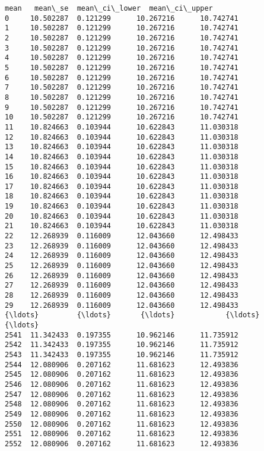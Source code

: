 \documentclass[11pt]{article}
\begin{document}
    \begin{Verbatim}[commandchars=\\\{\}]
           mean   mean\_se  mean\_ci\_lower  mean\_ci\_upper
0     10.502287  0.121299      10.267216      10.742741
1     10.502287  0.121299      10.267216      10.742741
2     10.502287  0.121299      10.267216      10.742741
3     10.502287  0.121299      10.267216      10.742741
4     10.502287  0.121299      10.267216      10.742741
5     10.502287  0.121299      10.267216      10.742741
6     10.502287  0.121299      10.267216      10.742741
7     10.502287  0.121299      10.267216      10.742741
8     10.502287  0.121299      10.267216      10.742741
9     10.502287  0.121299      10.267216      10.742741
10    10.502287  0.121299      10.267216      10.742741
11    10.824663  0.103944      10.622843      11.030318
12    10.824663  0.103944      10.622843      11.030318
13    10.824663  0.103944      10.622843      11.030318
14    10.824663  0.103944      10.622843      11.030318
15    10.824663  0.103944      10.622843      11.030318
16    10.824663  0.103944      10.622843      11.030318
17    10.824663  0.103944      10.622843      11.030318
18    10.824663  0.103944      10.622843      11.030318
19    10.824663  0.103944      10.622843      11.030318
20    10.824663  0.103944      10.622843      11.030318
21    10.824663  0.103944      10.622843      11.030318
22    12.268939  0.116009      12.043660      12.498433
23    12.268939  0.116009      12.043660      12.498433
24    12.268939  0.116009      12.043660      12.498433
25    12.268939  0.116009      12.043660      12.498433
26    12.268939  0.116009      12.043660      12.498433
27    12.268939  0.116009      12.043660      12.498433
28    12.268939  0.116009      12.043660      12.498433
29    12.268939  0.116009      12.043660      12.498433
{\ldots}         {\ldots}       {\ldots}            {\ldots}            {\ldots}
2541  11.342433  0.197355      10.962146      11.735912
2542  11.342433  0.197355      10.962146      11.735912
2543  11.342433  0.197355      10.962146      11.735912
2544  12.080906  0.207162      11.681623      12.493836
2545  12.080906  0.207162      11.681623      12.493836
2546  12.080906  0.207162      11.681623      12.493836
2547  12.080906  0.207162      11.681623      12.493836
2548  12.080906  0.207162      11.681623      12.493836
2549  12.080906  0.207162      11.681623      12.493836
2550  12.080906  0.207162      11.681623      12.493836
2551  12.080906  0.207162      11.681623      12.493836
2552  12.080906  0.207162      11.681623      12.493836

\end{Verbatim}
\end{document}
